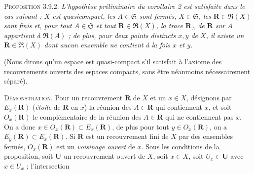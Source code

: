 \textsc{Proposition 3.9.2.} \textit{L'hypothèse préliminaire du
corollaire \textup{2} est satisfaite dans le cas suivant : $X$ est quasicompact, les
$A\in\mathfrak S$ sont fermés, $X\in\mathfrak S$, les
$\mathbf R\in\mathfrak R(X)$ sont finis et, pour tout $A\in\mathfrak S$ et
tout $\mathbf R\in\mathfrak R(X)$, la trace $\mathbf R_A$ de $\mathbf R$ sur
$A$ appartient à $\mathfrak R(A)$ ; de plus, pour deux points distincts $x,y$
de $X$, il existe un $\mathbf R\in\mathfrak R(X)$ dont aucun ensemble ne
contient à la fois $x$ et $y$.}

(Nous dirons qu'un espace est quasi-compact s'il satisfait à l'axiome des
recouvrements ouverts des espaces compacts, sans être néanmoins nécessairement
séparé).

\textsc{Démonstration.} Pour un recouvrement $\mathbf R$ de $X$ et un
$x\in X$, désignons par $E_x(\mathbf R)$ (\emph{étoile} de $\mathbf R$ en $x$) la
réunion des $A\in\mathbf R$ qui contiennent $x$, et soit $O_x(\mathbf R)$ le
complémentaire de la réunion des $A\in\mathbf R$ qui ne contiennent pas $x$.
On a donc $x\in O_x(\mathbf R)\subset E_x(\mathbf R)$, de plus pour tout
$y\in O_x(\mathbf R)$, on a $E_y(\mathbf R)\subset E_x(\mathbf R)$.
Si $\mathbf R$ est un recouvrement fini de $X$ par des ensembles fermés,
$O_x(\mathbf R)$ est un \textit{voisinage ouvert} de $x$.
Sous les conditions de la proposition, soit $\mathbf U$ un recouvrement
ouvert de $X$, soit $x\in X$, soit $U_x\in\mathbf U$ avec $x\in U_x$ ;
l'intersection

